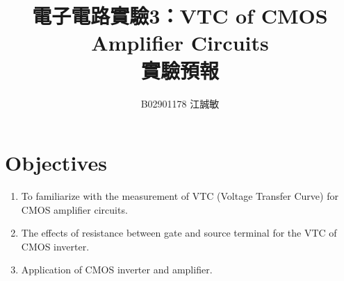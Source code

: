 \documentclass[12pt, a4paper]{article}
\title{ \bf {\huge 電子電路實驗3：VTC of CMOS Amplifier Circuits}\\ 實驗預報}
\author{B02901178 江誠敏}
\begin{document}
\maketitle

\section{Objectives}
\begin{enumerate}
  \item To familiarize with the measurement of VTC (Voltage Transfer Curve) for
    CMOS amplifier circuits.
  \item The effects of resistance between gate and source terminal for the VTC of
    CMOS inverter.
  \item Application of CMOS inverter and amplifier.
\end{enumerate}
\end{document}
